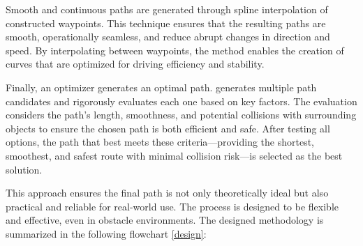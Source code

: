 Smooth and continuous paths are generated through spline interpolation of constructed waypoints. This technique ensures 
that the resulting paths are smooth, operationally seamless, and reduce abrupt changes in direction and speed. 
By interpolating between waypoints, the method enables the creation of curves that are optimized for driving efficiency 
and stability.

Finally, an optimizer generates an optimal path. 
generates multiple path candidates and rigorously evaluates each one based on key factors. 
The evaluation considers the path's length, smoothness, and potential collisions with surrounding objects to ensure the 
chosen path is both efficient and safe. After testing all options, the path that best meets these 
criteria—providing the shortest, smoothest, and safest route with minimal collision risk—is selected as the best solution. 

This approach ensures the final path is not only theoretically ideal but also practical and reliable for real-world use. 
The process is designed to be flexible and effective, even in obstacle environments. The designed methodology 
is summarized in the following flowchart \ref{design}:

